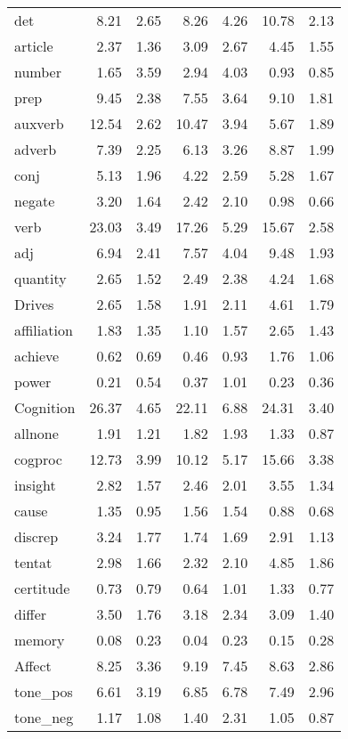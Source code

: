 \begin{longtable}{@{}p{3.4cm}rrrrrr@{}}
det & 8.21 & 2.65 & 8.26 & 4.26 & 10.78 & 2.13 \\
article & 2.37 & 1.36 & 3.09 & 2.67 & 4.45 & 1.55 \\
number & 1.65 & 3.59 & 2.94 & 4.03 & 0.93 & 0.85 \\
prep & 9.45 & 2.38 & 7.55 & 3.64 & 9.10 & 1.81 \\
auxverb & 12.54 & 2.62 & 10.47 & 3.94 & 5.67 & 1.89 \\
adverb & 7.39 & 2.25 & 6.13 & 3.26 & 8.87 & 1.99 \\
conj & 5.13 & 1.96 & 4.22 & 2.59 & 5.28 & 1.67 \\
negate & 3.20 & 1.64 & 2.42 & 2.10 & 0.98 & 0.66 \\
verb & 23.03 & 3.49 & 17.26 & 5.29 & 15.67 & 2.58 \\
adj & 6.94 & 2.41 & 7.57 & 4.04 & 9.48 & 1.93 \\
quantity & 2.65 & 1.52 & 2.49 & 2.38 & 4.24 & 1.68 \\
Drives & 2.65 & 1.58 & 1.91 & 2.11 & 4.61 & 1.79 \\
affiliation & 1.83 & 1.35 & 1.10 & 1.57 & 2.65 & 1.43 \\
achieve & 0.62 & 0.69 & 0.46 & 0.93 & 1.76 & 1.06 \\
power & 0.21 & 0.54 & 0.37 & 1.01 & 0.23 & 0.36 \\
Cognition & 26.37 & 4.65 & 22.11 & 6.88 & 24.31 & 3.40 \\
allnone & 1.91 & 1.21 & 1.82 & 1.93 & 1.33 & 0.87 \\
cogproc & 12.73 & 3.99 & 10.12 & 5.17 & 15.66 & 3.38 \\
insight & 2.82 & 1.57 & 2.46 & 2.01 & 3.55 & 1.34 \\
cause & 1.35 & 0.95 & 1.56 & 1.54 & 0.88 & 0.68 \\
discrep & 3.24 & 1.77 & 1.74 & 1.69 & 2.91 & 1.13 \\
tentat & 2.98 & 1.66 & 2.32 & 2.10 & 4.85 & 1.86 \\
certitude & 0.73 & 0.79 & 0.64 & 1.01 & 1.33 & 0.77 \\
differ & 3.50 & 1.76 & 3.18 & 2.34 & 3.09 & 1.40 \\
memory & 0.08 & 0.23 & 0.04 & 0.23 & 0.15 & 0.28 \\
Affect & 8.25 & 3.36 & 9.19 & 7.45 & 8.63 & 2.86 \\
tone\_pos & 6.61 & 3.19 & 6.85 & 6.78 & 7.49 & 2.96 \\
tone\_neg & 1.17 & 1.08 & 1.40 & 2.31 & 1.05 & 0.87 \\

\end{longtable}
